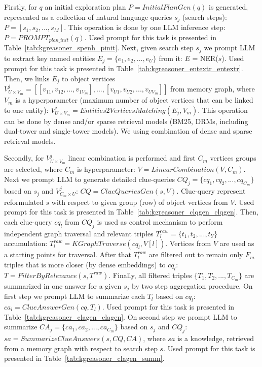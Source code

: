 Firstly, for $q$ an initial exploration plan $P = InitialPlanGen(q)$ is generated, represented as a collection of natural language queries $s_j$ (search steps): $P=[s_1,s_2,...,s_M]$. This operation is done by one LLM inference step: $P = PROMPT_{plan\_init}(q)$. Used prompt for this task is presented in Table~\ref{tab:kgreasoner_spenh_pinit}. Next, given search step $s_j$ we prompt LLM to extract key named entities $E_j = \{e_1, e_2, ..., e_U\}$ from it: $E$ = NER($s$). Used prompt for this task is presented in Table~\ref{tab:kgreasoner_entextr_entextr}. Then, we links $E_j$ to object vertices $V^j_{U \times V_m} = [[v_{11}, v_{12}, ..., v_{1V_m}], ..., [v_{U1}, v_{U2}, ..., v_{UV_m}]]$ from memory graph, where $V_m$ is a hyperparameter (maximum number of object vertices that can be linked to one entity): $V^j_{ U \times V_m} = Entities2VerticesMatching(E_j, V_m)$. This operation can be done by dense and/or sparse retrieval models (BM25, DRMs, including dual-tower and single-tower models). We using combination of dense and sparse retrieval models.

Secondly, for $V^j_{U \times V_m}$ linear combination is performed and first $C_m$ vertices groups are selected, where $C_m$ is hyperparameter: $V = LinearCombination(V, C_m)$. Next we prompt LLM to generate detailed clue-queries $CQ_j = \{cq_1, cq_2, ..., cq_{C_m}\}$ based on $s_j$ and $V^j_{C_m \times U}$: $CQ = ClueQueriesGen(s, V)$. Clue-query represent reformulated $s$ with respect to given group (row) of object vertices from $V$. Used prompt for this task is presented in Table~\ref{tab:kgreasoner_clqgen_clqgen}. Then, each clue-query $cq_l$ from $CQ_j$ is used as control mechanism to perform independent graph traversal and relevant triples $T^{raw}_{l} = \{t_1, t_2, ..., t_Y\}$ accumulation: $T^{raw}_{l} = KGraphTraverse(cq_l, V[l])$. Vertices from $V$ are used as a starting points for traversal. After that $T^{raw}_{l}$ are filtered out to remain only $F_m$ triples that is more closer (by dense embeddings) to $cq_l$: $T = FilterByRelevance(s, T^{raw})$. Finally, all filtered triples $\{T_1, T_2, ..., T_{C_m}\}$ are summarized in one answer for a given $s_j$ by two step aggregation procedure. On first step we prompt LLM to summarize each $T_l$ based on $cq_l$: $ca_l = ClueAnswerGen(cq, T_l)$. Used prompt for this task is presented in Table~\ref{tab:kgreasoner_clagen_clagen}. On second step we prompt LLM to summarize $CA_j = \{ca_1, ca_2, ..., ca_{C_m}\}$ based on $s_j$ and $CQ_j$: $sa = SummarizeClueAnswers(s, CQ, CA)$, where $sa$ is a knowledge, retrieved from a memory graph with respect to search step $s$. Used prompt for this task is presented in Table~\ref{tab:kgreasoner_clagen_summ}.

